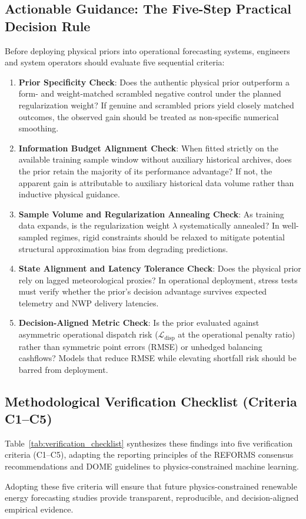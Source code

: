 \subsection{Actionable Guidance: The Five-Step Practical Decision Rule}
Before deploying physical priors into operational forecasting systems, engineers and system operators should evaluate five sequential criteria:
\begin{enumerate}[leftmargin=*]
\item \textbf{Prior Specificity Check}: Does the authentic physical prior outperform a form- and weight-matched scrambled negative control under the planned regularization weight? If genuine and scrambled priors yield closely matched outcomes, the observed gain should be treated as non-specific numerical smoothing.
\item \textbf{Information Budget Alignment Check}: When fitted strictly on the available training sample window without auxiliary historical archives, does the prior retain the majority of its performance advantage? If not, the apparent gain is attributable to auxiliary historical data volume rather than inductive physical guidance.
\item \textbf{Sample Volume and Regularization Annealing Check}: As training data expands, is the regularization weight $\lambda$ systematically annealed? In well-sampled regimes, rigid constraints should be relaxed to mitigate potential structural approximation bias from degrading predictions.
\item \textbf{State Alignment and Latency Tolerance Check}: Does the physical prior rely on lagged meteorological proxies? In operational deployment, stress tests must verify whether the prior's decision advantage survives expected telemetry and NWP delivery latencies.
\item \textbf{Decision-Aligned Metric Check}: Is the prior evaluated against asymmetric operational dispatch risk ($\mathcal{L}_{\text{disp}}$ at the operational penalty ratio) rather than symmetric point errors (RMSE) or unhedged balancing cashflows? Models that reduce RMSE while elevating shortfall risk should be barred from deployment.
\end{enumerate}

\subsection{Methodological Verification Checklist (Criteria C1--C5)}
\label{sec:verification_criteria}
Table~\ref{tab:verification_checklist} synthesizes these findings into five verification criteria (C1--C5), adapting the reporting principles of the REFORMS consensus recommendations \cite{kapoor2024reforms} and DOME guidelines \cite{walsh2021dome} to physics-constrained machine learning.



Adopting these five criteria will ensure that future physics-constrained renewable energy forecasting studies provide transparent, reproducible, and decision-aligned empirical evidence.
